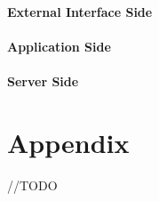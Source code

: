 \documentclass{report}
\begin{document}
			\subsubsection{External Interface Side}

			\subsubsection{Application Side}

			\subsubsection{Server Side}


\chapter{Appendix}
//TODO
\end{document}
